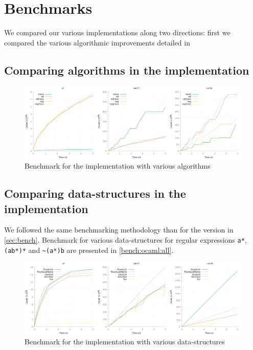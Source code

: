 \section{Benchmarks}
\label{sec:bench}

We compared our various implementations along two directions: first
we compared the various algorithmic improvements detailed in
\


\subsection{Comparing algorithms in the \haskell implementation}

\begin{figure}[h]
  \centering
  \includegraphics[width=\linewidth]{measure/haskell_all.png}
  \caption{Benchmark for the \haskell implementation with various algorithms}
  \label{bench:haskell:all}
\end{figure}

\subsection{Comparing data-structures in the \ocaml implementation}

We followed the same benchmarking methodology than for the \haskell
version in \autoref{sec:bench}. Benchmark for various data-structures
for regular expressions \verb/a*/, \verb/(ab*)*/ and \verb/~(a*)b/ are
presented in \autoref{bench:ocaml:all}.

\begin{figure}[h]
  \centering
  \includegraphics[width=\linewidth]{measure/ocaml_all.png}
  \caption{Benchmark for the \ocaml implementation with various data-structures}
  \label{bench:ocaml:all}
\end{figure}

